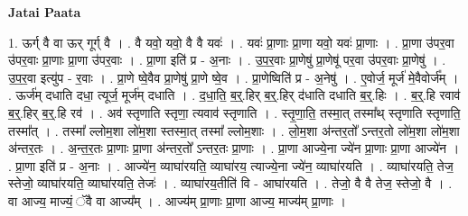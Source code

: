 \documentclass[17pt]{extarticle}
\begin{document}
\textbf{Jatai Paata} \newline

1. ऊर्ग् वै वा ऊर् गूर्ग् वै । . वै यवो॒ यवो॒ वै वै यवः॑ । . यवः॑ प्रा॒णाः प्रा॒णा यवो॒ यवः॑ प्रा॒णाः । . प्रा॒णा उ॑पर॒वा उ॑पर॒वाः प्रा॒णाः प्रा॒णा उ॑पर॒वाः । . प्रा॒णा इति॑ प्र - अ॒नाः । . उ॒प॒र॒वाः प्रा॒णेषु॑ प्रा॒णेषू॑ पर॒वा उ॑पर॒वाः प्रा॒णेषु॑ । . उ॒प॒र॒वा इत्यु॑प - र॒वाः । . प्रा॒णे ष्वे॒वैव प्रा॒णेषु॑ प्रा॒णे ष्वे॒व । . प्रा॒णेष्विति॑ प्र - अ॒नेषु॑ । . ए॒वोर्ज॒ मूर्ज॑ मे॒वैवोर्ज᳚म् । . ऊर्ज॑म् दधाति दधा॒ त्यूर्ज॒ मूर्ज॑म् दधाति । . द॒धा॒ति॒ ब॒र्॒.हिर् ब॒र्॒.हिर् द॑धाति दधाति ब॒र्॒.हिः । . ब॒र्॒.हि रवाव॑ ब॒र्॒.हिर् ब॒र्॒.हि रव॑ । . अव॑ स्तृणाति स्तृणा॒ त्यवाव॑ स्तृणाति । . स्तृ॒णा॒ति॒ तस्मा॒त् तस्मा᳚थ् स्तृणाति स्तृणाति॒ तस्मा᳚त् । . तस्मा᳚ ल्लोम॒शा लो॑म॒शा स्तस्मा॒त् तस्मा᳚ ल्लोम॒शाः । . लो॒म॒शा अ॑न्तर॒तो᳚ ऽन्तर॒तो लो॑म॒शा लो॑म॒शा अ॑न्तर॒तः । . अ॒न्त॒र॒तः प्रा॒णाः प्रा॒णा अ॑न्तर॒तो᳚ ऽन्तर॒तः प्रा॒णाः । . प्रा॒णा आज्ये॒ना ज्ये॑न प्रा॒णाः प्रा॒णा आज्ये॑न । . प्रा॒णा इति॑ प्र - अ॒नाः । . आज्ये॑न॒ व्याघा॑रयति॒ व्याघा॑रय॒ त्याज्ये॒ना ज्ये॑न॒ व्याघा॑रयति । . व्याघा॑रयति॒ तेज॒ स्तेजो॒ व्याघा॑रयति॒ व्याघा॑रयति॒ तेजः॑ । . व्याघा॑रय॒तीति॑ वि - आघा॑रयति । . तेजो॒ वै वै तेज॒ स्तेजो॒ वै । . वा आज्य॒ माज्यं॒ ॅवै वा आज्य᳚म् । . आज्य॑म् प्रा॒णाः प्रा॒णा आज्य॒ माज्य॑म् प्रा॒णाः । \newline
\end{document}
